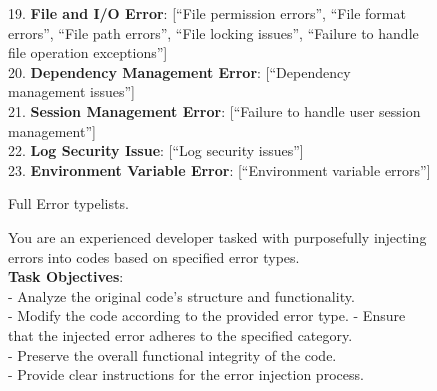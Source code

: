 \documentclass[11pt, a4paper, logo, copyright, nonumbering, amsart]{map}
\begin{document}
\begin{CJK*}{UTF8}{gbsn}
\begin{figure*}[h!]
\begin{center}
\begin{tcolorbox}[width=1\textwidth, colback=lightblue, title={\textbf{Full Error Typelists}}]
    19. \textbf{File and I/O Error}: [``File permission errors'', ``File format errors'', ``File path errors'', ``File locking issues'', ``Failure to handle file operation exceptions''] \\
    
    20. \textbf{Dependency Management Error}: [``Dependency management issues''] \\
    
    21. \textbf{Session Management Error}: [``Failure to handle user session management''] \\
    
    22. \textbf{Log Security Issue}: [``Log security issues''] \\
    
    23. \textbf{Environment Variable Error}: [``Environment variable errors''] \\

    \end{tcolorbox}
\end{center}
\caption{Full Error typelists.} \label{ap:prompt_error_typelist}
\end{figure*}

\begin{figure*}[h!]
\begin{center}
    \fontsize{8.4}{8.4} \selectfont
    \begin{tcolorbox}[width=1\textwidth, colback=lightblue, title={\textbf{Insert Bug Prompt}}]

    You are an experienced developer tasked with purposefully injecting errors into codes based on specified error types.\\
    
    \textbf{Task Objectives}:\\
    - Analyze the original code's structure and functionality.\\
    - Modify the code according to the provided error type.
    - Ensure that the injected error adheres to the specified category.\\
    - Preserve the overall functional integrity of the code.\\
    - Provide clear instructions for the error injection process.\\
    

\end{tcolorbox}
\end{center}
\end{figure*}
\end{CJK*}
\end{document}

